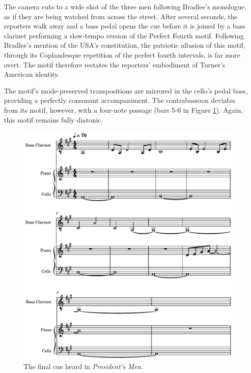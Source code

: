 The camera cuts to a wide shot of the three men following Bradlee's monologue, as if they are being watched from across the street.
After several seconds, the reporters walk away and a bass pedal opens the cue before it is joined by a bass clarinet performing a slow-tempo version of the Perfect Fourth motif.
Following Bradlee's mention of the USA's constitution, the patriotic allusion of this motif, through its Coplandesque repetition of the perfect fourth intervals, is far more overt.
The motif therefore restates the reporters' embodiment of Turner's American identity.

The motif's mode-preserved transpositions are mirrored in the cello's pedal bass, providing a perfectly consonant accompaniment.
The contrabassoon deviates from its motif, however, with a four-note passage (bars 5-6 in Figure \ref{fig:president-bradlee-lawn}).
Again, this motif remains fully diatonic.

\begin{figure}
    \centering
    \includegraphics[width=0.5\linewidth]{img/president-bradlee-lawn.pdf}
    \caption{The final cue heard in \textit{President's Men}.}
    \label{fig:president-bradlee-lawn}
\end{figure}

